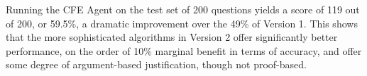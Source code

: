Running the CFE Agent on the test set of 200 questions yields a score of 119 out of 200, or 59.5\%, a dramatic improvement over the 49\% of Version 1.  This shows that the more sophisticated algorithms in Version 2 offer significantly better performance, on the order of 10\% marginal benefit in terms of accuracy, and offer some degree of argument-based justification, though not proof-based.  

















